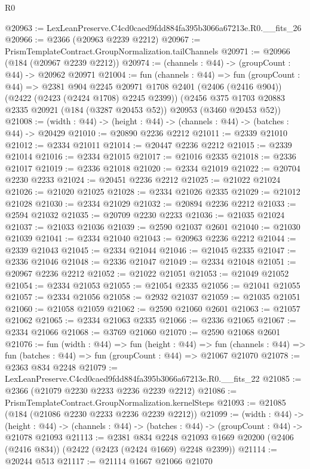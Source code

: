 \begin{lexlean}{R0}
\begin{coremodule}
@20963 := LexLeanPreserve.C4cd0caed9fdd884fa395b3066a67213e.R0.__fits_26
@20966 := @2366 (@20963 @2239 @2212)
@20967 := PrismTemplateContract.GroupNormalization.tailChannels
@20971 := @20966 (@184 (@20967 @2239 @2212))
@20974 := (channels : @44) -> (groupCount : @44) -> @20962 @20971
@21004 := fun (channels : @44) =>
  fun (groupCount : @44) =>
  @2381
    @904
    @2245
    @20971
    @1708
    @2401
    (@2406 (@2416 @904))
    (@2422 (@2423 (@2424 @1708) @2245 @2399))
    (@2456 @375 @1703 @20883 @2335 @20921 (@184 (@3287 @20453 @52)) @20953 (@3460 @20453 @52))
@21008 := (width : @44) -> (height : @44) -> (channels : @44) -> (batches : @44) -> @20429
@21010 := @20890 @2236 @2212
@21011 := @2339 @21010
@21012 := @2334 @21011
@21014 := @20447 @2236 @2212
@21015 := @2339 @21014
@21016 := @2334 @21015
@21017 := @21016 @2335
@21018 := @2336 @21017
@21019 := @2336 @21018
@21020 := @2334 @21019
@21022 := @20704 @2230 @2233
@21024 := @20451 @2236 @2212
@21025 := @21022 @21024
@21026 := @21020 @21025
@21028 := @2334 @21026 @2335
@21029 := @21012 @21028
@21030 := @2334 @21029
@21032 := @20894 @2236 @2212
@21033 := @2594 @21032
@21035 := @20709 @2230 @2233
@21036 := @21035 @21024
@21037 := @21033 @21036
@21039 := @2590 @21037 @2601
@21040 := @21030 @21039
@21041 := @2334 @21040
@21043 := @20963 @2236 @2212
@21044 := @2339 @21043
@21045 := @2334 @21044
@21046 := @21045 @2335
@21047 := @2336 @21046
@21048 := @2336 @21047
@21049 := @2334 @21048
@21051 := @20967 @2236 @2212
@21052 := @21022 @21051
@21053 := @21049 @21052
@21054 := @2334 @21053
@21055 := @21054 @2335
@21056 := @21041 @21055
@21057 := @2334 @21056
@21058 := @2932 @21037
@21059 := @21035 @21051
@21060 := @21058 @21059
@21062 := @2590 @21060 @2601
@21063 := @21057 @21062
@21065 := @2334 @21063 @2335
@21066 := @2336 @21065
@21067 := @2334 @21066
@21068 := @3769 @21060
@21070 := @2590 @21068 @2601
@21076 := fun (width : @44) =>
  fun (height : @44) =>
  fun (channels : @44) => fun (batches : @44) => fun (groupCount : @44) => @21067 @21070
@21078 := @2363 @834 @2248
@21079 := LexLeanPreserve.C4cd0caed9fdd884fa395b3066a67213e.R0.__fits_22
@21085 := @2366 (@21079 @2230 @2233 @2236 @2239 @2212)
@21086 := PrismTemplateContract.GroupNormalization.kernelSteps
@21093 := @21085 (@184 (@21086 @2230 @2233 @2236 @2239 @2212))
@21099 := (width : @44) ->
  (height : @44) -> (channels : @44) -> (batches : @44) -> (groupCount : @44) -> @21078 @21093
@21113 := @2381
    @834
    @2248
    @21093
    @1669
    @20200
    (@2406 (@2416 @834))
    (@2422 (@2423 (@2424 @1669) @2248 @2399))
@21114 := @20244 @513
@21117 := @21114 @1667 @21066 @21070

\end{coremodule}
\end{lexlean}
